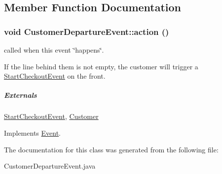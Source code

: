 \subsection{Member Function Documentation}
\hypertarget{class_customer_departure_event_0245be14abc9118d39123158559e1cdb}{
\subsubsection[{action}]{\setlength{\rightskip}{0pt plus 5cm}void CustomerDepartureEvent::action ()}}
\label{class_customer_departure_event_0245be14abc9118d39123158559e1cdb}


called when this event \char`\"{}happens\char`\"{}. 

If the line behind them is not empty, the customer will trigger a \hyperlink{class_start_checkout_event}{StartCheckoutEvent} on the front.

\subparagraph*{Externals}

\hyperlink{class_start_checkout_event}{StartCheckoutEvent}, \hyperlink{class_customer}{Customer} 

Implements \hyperlink{class_event_fea360b9a95713e43cf3f9fa44150074}{Event}.

The documentation for this class was generated from the following file:\begin{CompactItemize}
\item 
CustomerDepartureEvent.java\end{CompactItemize}
